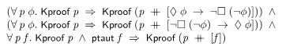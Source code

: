 \documentclass[letterpaper]{article}
\renewcommand{\HOLConst}[1]{{\textsf{\upshape\small #1}}}
\newenvironment{holmath}{\begin{displaymath}\begin{array}{l}}{\end{array}\end{displaymath}\ignorespacesafterend}
\begin{document}
\begin{holmath}
\;\;\;\;\;(\HOLSymConst{\HOLTokenForall{}}\HOLBoundVar{p}\;\HOLBoundVar{\ensuremath{\phi}}.\;\HOLConst{Kproof}\;\HOLBoundVar{p}\;\HOLSymConst{\HOLTokenImp{}}\;\HOLConst{Kproof}\;(\HOLBoundVar{p}\;\HOLSymConst{\HOLTokenDoublePlus}\;[\HOLSymConst{\ensuremath{\Diamond}}\;\HOLBoundVar{\ensuremath{\phi}}\;\HOLSymConst{\ensuremath{\rightarrow}}\;\HOLSymConst{\HOLTokenNeg{}}\HOLSymConst{\ensuremath{\Box}}\;(\HOLSymConst{\HOLTokenNeg{}}\HOLBoundVar{\ensuremath{\phi}})]))\;\HOLSymConst{\HOLTokenConj{}}\\
\;\;\;\;\;(\HOLSymConst{\HOLTokenForall{}}\HOLBoundVar{p}\;\HOLBoundVar{\ensuremath{\phi}}.\;\HOLConst{Kproof}\;\HOLBoundVar{p}\;\HOLSymConst{\HOLTokenImp{}}\;\HOLConst{Kproof}\;(\HOLBoundVar{p}\;\HOLSymConst{\HOLTokenDoublePlus}\;[\HOLSymConst{\HOLTokenNeg{}}\HOLSymConst{\ensuremath{\Box}}\;(\HOLSymConst{\HOLTokenNeg{}}\HOLBoundVar{\ensuremath{\phi}})\;\HOLSymConst{\ensuremath{\rightarrow}}\;\HOLSymConst{\ensuremath{\Diamond}}\;\HOLBoundVar{\ensuremath{\phi}}]))\;\HOLSymConst{\HOLTokenConj{}}\\
\;\;\;\;\;\HOLSymConst{\HOLTokenForall{}}\HOLBoundVar{p}\;\HOLBoundVar{f}.\;\HOLConst{Kproof}\;\HOLBoundVar{p}\;\HOLSymConst{\HOLTokenConj{}}\;\HOLConst{ptaut}\;\HOLBoundVar{f}\;\HOLSymConst{\HOLTokenImp{}}\;\HOLConst{Kproof}\;(\HOLBoundVar{p}\;\HOLSymConst{\HOLTokenDoublePlus}\;[\HOLBoundVar{f}])
\end{holmath}
\end{document}

